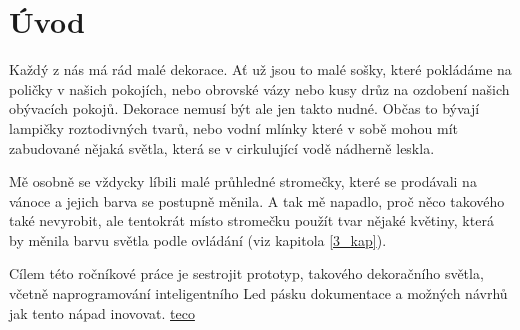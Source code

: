 \chapter*{Úvod}

Každý z nás má rád malé dekorace. Ať už jsou to malé sošky, které pokládáme na poličky v našich pokojích, nebo obrovské vázy nebo kusy drůz na ozdobení našich obývacích pokojů. Dekorace nemusí být ale jen takto nudné. Občas to bývají lampičky roztodivných tvarů, nebo vodní mlínky které v sobě mohou mít zabudované nějaká světla, která se v cirkulující vodě \cite{schommers} nádherně leskla.

Mě osobně se vždycky líbili malé průhledné stromečky, které se prodávali na vánoce a jejich barva se postupně měnila. A tak mě napadlo, proč něco takového také nevyrobit, ale tentokrát místo stromečku použít tvar nějaké květiny, která by měnila barvu světla podle ovládání (viz kapitola \ref{3_kap}).

Cílem této ročníkové práce je sestrojit prototyp, takového dekoračního světla, včetně naprogramování inteligentního Led pásku dokumentace a možných návrhů jak tento nápad inovovat.
\href{https://www.tecomat.cz/products/}{teco}

%

\newpage
